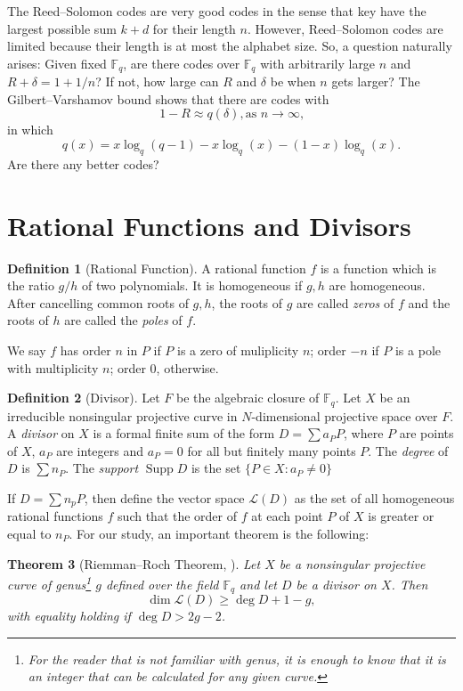 \documentclass[11pt]{amsart}
\newtheorem{thm}{Theorem}[section]
\theoremstyle{definition}
\newtheorem{defn}[thm]{Definition}
\theoremstyle{example}
\theoremstyle{remark}
\numberwithin{equation}{section}
\DeclareMathOperator{\Supp}{Supp}
\begin{document}
The Reed--Solomon codes are very good codes in the sense that key have the largest possible sum $k + d$ for their length $n$. However, Reed--Solomon codes are limited because their length is at most the alphabet size. So, a question naturally arises: Given fixed $\mathbb{F}_q$, are there codes over $\mathbb{F}_q$ with arbitrarily large $n$ and $R + \delta = 1 + 1/n$? If not, how large can $R$ and $\delta$ be when $n$ gets larger? The Gilbert--Varshamov bound shows that there are codes with 
\begin{equation}
	1 - R \approx q(\delta), \text{as $n \to \infty$,}
\end{equation}
in which
\begin{equation}
	q(x) = x \log_q(q-1) - x\log_q(x) - (1-x)\log_q(x).
\end{equation}
Are there any better codes?

\section{Rational Functions and Divisors}

\begin{defn}[Rational Function]
	A rational function $f$	is a function which is the ratio $g/h$ of two polynomials.
	It is homogeneous if $g, h$ are homogeneous.
	After cancelling common roots of $g, h$, the roots of $g$ are called \emph{zeros} of $f$ and the roots of $h$ are called the \emph{poles} of $f$.
\end{defn}

	We say $f$ has order $n$ in $P$ if $P$ is a zero of muliplicity $n$; order $-n$ if $P$ is a pole with multiplicity $n$; order $0$, otherwise.

\begin{defn}[Divisor] 
	Let $F$ be the algebraic closure of $\mathbb{F}_q$.
	Let $X$ be an irreducible nonsingular projective curve in $N$-dimensional projective space over $F$.
	A \emph{divisor} on $X$ is a formal finite sum of the form $D = \sum a_P P$, where $P$ are points of $X$, $a_P$ are integers and $a_P = 0$ for all but finitely many points $P$.
	The \emph{degree} of $D$ is $\sum n_P$.
	The \emph{support} $\Supp D$ is the set $\{P \in X : a_P \neq 0\}$
\end{defn}

If $D = \sum n_p P$, then define the vector space $\mathcal L(D)$ as the set of all homogeneous rational functions $f$ such that the order of $f$ at each point $P$ of $X$ is greater or equal to $n_P$.
For our study, an important theorem is the following:
\begin{thm}[Riemman--Roch Theorem, \cite{Wal00}]
	Let $X$ be a nonsingular projective curve of genus\footnote{For the reader that is not familiar with genus, it is enough to know that it is an integer that can be calculated for any given curve.} $g$ defined over the field $\mathbb{F}_q$ and let $D$ be a divisor on $X$. Then
	\begin{equation}
		\dim \mathcal L(D) \ge \deg D + 1 - g,
	\end{equation}
	with equality holding if $\deg D > 2g - 2$.
\end{thm}
\end{document}
